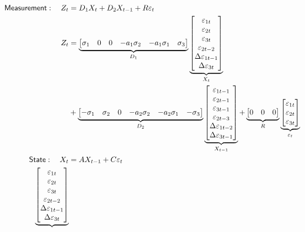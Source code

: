 \documentclass[a4paper,12pt]{article}
\begin{document}
\begin{align}
\mathsf{Measurement}:\quad Z_{t}& =D_{1}X_{t}+D_{2}X_{t-1}+R\varepsilon _{t}
\notag \\
Z_{t}& =\underbrace{%
\begin{bmatrix}
\sigma _{1} & 0 & 0 & -a_{1}\sigma _{2} & -a_{1}\sigma _{1} & \sigma _{3}%
\end{bmatrix}%
}_{D_{1}}\underbrace{%
\begin{bmatrix}
\varepsilon _{1t} \\
\varepsilon _{2t} \\
\varepsilon _{3t} \\
\varepsilon _{2t-2} \\
\Delta \varepsilon _{1t-1} \\
\Delta \varepsilon _{3t}%
\end{bmatrix}%
}_{X_{t}} \\
& +\underbrace{%
\begin{bmatrix}
-\sigma _{1} & \sigma _{2} & 0 & -a_{2}\sigma _{2} & -a_{2}\sigma _{1} &
-\sigma _{3}%
\end{bmatrix}%
}_{D_{2}}\underbrace{%
\begin{bmatrix}
\varepsilon _{1t-1} \\
\varepsilon _{2t-1} \\
\varepsilon _{3t-1} \\
\varepsilon _{2t-3} \\
\Delta \varepsilon _{1t-2} \\
\Delta \varepsilon _{3t-1}%
\end{bmatrix}%
}_{X_{t-1}}+\underbrace{%
\begin{bmatrix}
0 & 0 & 0%
\end{bmatrix}%
}_{R}\underbrace{%
\begin{bmatrix}
\varepsilon _{1t} \\
\varepsilon _{2t} \\
\varepsilon _{3t}%
\end{bmatrix}%
}_{\varepsilon _{t}} \\
\mathsf{State}:\quad X_{t}& =AX_{t-1}+C\varepsilon _{t} \\
\underbrace{%
\begin{bmatrix}
\varepsilon _{1t} \\
\varepsilon _{2t} \\
\varepsilon _{3t} \\
\varepsilon _{2t-2} \\
\Delta \varepsilon _{1t-1} \\
\Delta \varepsilon _{3t}%

\end{bmatrix}}
\end{align}
\end{document}
